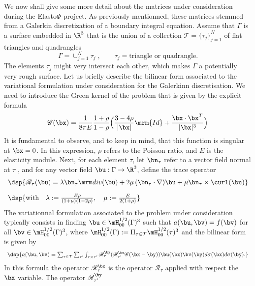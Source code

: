 We now shall give some more detail about the matrices under consideration during the Elasto$\Phi$ project. 
As previously mentionned, these matrices stemmed from a Galerkin discretization of a boundary integral 
equation. Assume that $\Gamma$ is a surface embedded in $\R^{3}$ that is the union of a collection 
$\mathcal{T} = \{\tau_{j}\}_{j=1}^{N}$ of flat triangles and quadrangles
$$
\Gamma = \mathop{\cup}_{j=1}^{N}\tau_{j}\;,\quad\quad \tau_{j} = \textrm{triangle or quadrangle}.
$$
The elements $\tau_{j}$ might very intersect each other, which makes $\Gamma$ a potentially very rough surface.
Let us briefly describe the bilinear form associated to the variational formulation under consideration for 
the Galerkinn discretisation. We need to introduce the Green kernel of the problem that is given by the explicit formula 
$$
\mathscr{G}(\bx) = \frac{1}{8\pi E}\frac{1+\rho}{1-\rho}\Big( \frac{3-4\rho}{\vert \bx\vert}\mrm{Id}  +\frac{\bx\cdot\bx^{T}}{\vert \bx\vert^{3}}\Big)
$$
It is fundamental to observe, and to keep in mind, that this function is singular at $\bx = 0$. In this expression, $\rho$ 
refers to the Poisson ratio, and $E$ is the elasticity module. Next, for each element $\tau$, let  $\bn_{\tau}$ refer to a vector field 
normal at $\tau$ , and for any vector field $\bu:\Gamma\to \R^{3}$, define the trace operator
$$
\begin{array}{l}
\dsp{ \mathscr{R}_{\tau}(\bu) = \lambda\bn_{\tau}\div(\bu)+2\mu\,(\bn_{\tau}\cdot\nabla)\bu + \mu\bn_{\tau}\times\curl(\bu) }\\[10pt]
\dsp{ \textrm{with}\quad \lambda := \frac{E\rho}{(1+\mu)(1-2\rho)},\quad \mu := \frac{E}{2(1+\rho)}}
\end{array}
$$
The variationnal formulation associated to the problem under consideration typically consists in finding $\bu\in \mH^{1/2}_{00}(\Gamma)^{3}$ 
such that $a(\bu,\bv) = f(\bv)$ for all $\bv\in \mH^{1/2}_{00}(\Gamma)^{3}$, where $\mH^{1/2}_{00}(\Gamma):=\Pi_{\tau\in\mathcal{T}}\mH^{1/2}_{00}(\tau)^{3}$
and the bilinear form is given by
\begin{equation}\label{VariationnalFormulation}
\begin{array}{l}
\dsp{ a(\bu,\bv) = \sum_{\tau\in\mathcal{T}}\sum_{\tau'}\int_{\tau\times\tau'}\mathscr{R}_{\tau}^{\by}(\mathscr{R}_{\tau'}^{\bx}\mathscr{G}(\bx-\by)) \bu(\bx)\bv(\by) d\sigma(\bx) d\sigma(\by).  }
\end{array}
\end{equation}
In this formula the operator $\mathscr{R}_{\tau}^{\bx}$ is the operator $\mathscr{R}_{\tau}$ applied with respect the $\bx$ variable. The operator $\mathscr{R}_{\tau'}^{\by}$ 
